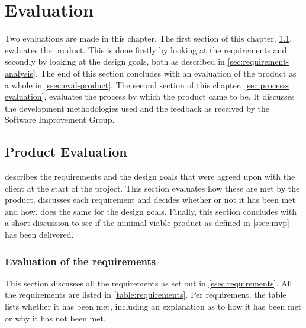 \chapter{Evaluation}
\label{cha:evaluation}

Two evaluations are made in this chapter. The first section of this chapter,
\cref{sec:product-evaluation}, evaluates the product. This is done firstly by
looking at the requirements and secondly by looking at the design goals, both as
described in \cref{sec:requirement-analysis}. The end of this section concludes
with an evaluation of the product as a whole in \cref{ssec:eval-product}. The
second section of this chapter, \cref{sec:process-evaluation}, evaluates the
process by which the product came to be. It discusses the development
methodologies used and the feedback as received by the Software Improvement
Group.

\section{Product Evaluation}
\label{sec:product-evaluation}

 describes the requirements and the design goals
that were agreed upon with the client at the start of the project. This section
evaluates how these are met by the product. 
discusses each requirement and decides whether or not it has been met and how.
 does the same for the design goals.  Finally, this
section concludes with a short discussion to see if the minimal viable product
as defined in \cref{ssec:mvp} has been delivered.

\subsection{Evaluation of the requirements}
\label{ssec:eval-requirements}

This section discusses all the requirements as set out in
\cref{ssec:requirements}. All the requirements are listed in
\cref{table:requirements}. Per requirement, the table lists whether it has been
met, including an explanation as to how it has been met or why it has not been
met.

